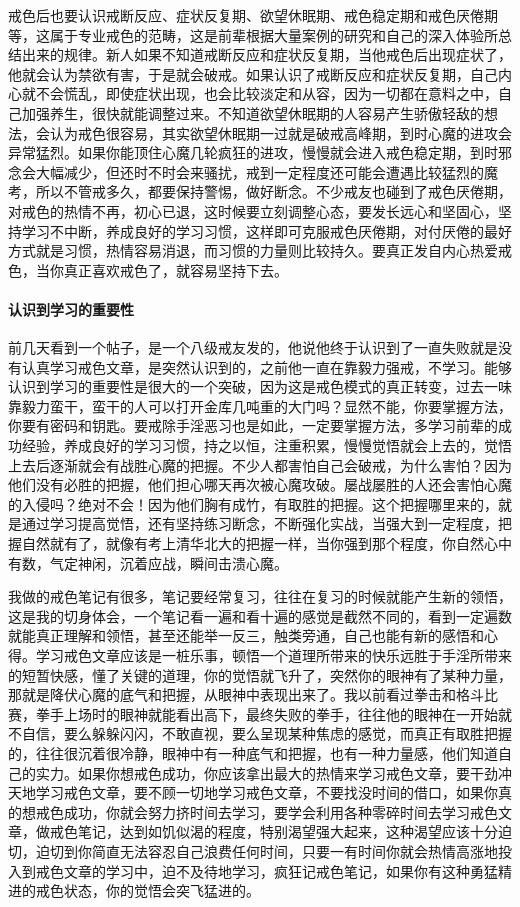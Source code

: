 戒色后也要认识戒断反应、症状反复期、欲望休眠期、戒色稳定期和戒色厌倦期等，这属于专业戒色的范畴，这是前辈根据大量案例的研究和自己的深入体验所总结出来的规律。新人如果不知道戒断反应和症状反复期，当他戒色后出现症状了，他就会认为禁欲有害，于是就会破戒。如果认识了戒断反应和症状反复期，自己内心就不会慌乱，即使症状出现，也会比较淡定和从容，因为一切都在意料之中，自己加强养生，很快就能调整过来。不知道欲望休眠期的人容易产生骄傲轻敌的想法，会认为戒色很容易，其实欲望休眠期一过就是破戒高峰期，到时心魔的进攻会异常猛烈。如果你能顶住心魔几轮疯狂的进攻，慢慢就会进入戒色稳定期，到时邪念会大幅减少，但还时不时会来骚扰，戒到一定程度还可能会遭遇比较猛烈的魔考，所以不管戒多久，都要保持警惕，做好断念。不少戒友也碰到了戒色厌倦期，对戒色的热情不再，初心已退，这时候要立刻调整心态，要发长远心和坚固心，坚持学习不中断，养成良好的学习习惯，这样即可克服戒色厌倦期，对付厌倦的最好方式就是习惯，热情容易消退，而习惯的力量则比较持久。要真正发自内心热爱戒色，当你真正喜欢戒色了，就容易坚持下去。

\paragraph{认识到学习的重要性}

前几天看到一个帖子，是一个八级戒友发的，他说他终于认识到了一直失败就是没有认真学习戒色文章，是突然认识到的，之前他一直在靠毅力强戒，不学习。能够认识到学习的重要性是很大的一个突破，因为这是戒色模式的真正转变，过去一味靠毅力蛮干，蛮干的人可以打开金库几吨重的大门吗？显然不能，你要掌握方法，你要有密码和钥匙。要戒除手淫恶习也是如此，一定要掌握方法，多学习前辈的成功经验，养成良好的学习习惯，持之以恒，注重积累，慢慢觉悟就会上去的，觉悟上去后逐渐就会有战胜心魔的把握。不少人都害怕自己会破戒，为什么害怕？因为他们没有必胜的把握，他们担心哪天再次被心魔攻破。屡战屡胜的人还会害怕心魔的入侵吗？绝对不会！因为他们胸有成竹，有取胜的把握。这个把握哪里来的，就是通过学习提高觉悟，还有坚持练习断念，不断强化实战，当强大到一定程度，把握自然就有了，就像有考上清华北大的把握一样，当你强到那个程度，你自然心中有数，气定神闲，沉着应战，瞬间击溃心魔。

我做的戒色笔记有很多，笔记要经常复习，往往在复习的时候就能产生新的领悟，这是我的切身体会，一个笔记看一遍和看十遍的感觉是截然不同的，看到一定遍数就能真正理解和领悟，甚至还能举一反三，触类旁通，自己也能有新的感悟和心得。学习戒色文章应该是一桩乐事，顿悟一个道理所带来的快乐远胜于手淫所带来的短暂快感，懂了关键的道理，你的觉悟就飞升了，突然你的眼神有了某种力量，那就是降伏心魔的底气和把握，从眼神中表现出来了。我以前看过拳击和格斗比赛，拳手上场时的眼神就能看出高下，最终失败的拳手，往往他的眼神在一开始就不自信，要么躲躲闪闪，不敢直视，要么呈现某种焦虑的感觉，而真正有取胜把握的，往往很沉着很冷静，眼神中有一种底气和把握，也有一种力量感，他们知道自己的实力。如果你想戒色成功，你应该拿出最大的热情来学习戒色文章，要干劲冲天地学习戒色文章，要不顾一切地学习戒色文章，不要找没时间的借口，如果你真的想戒色成功，你就会努力挤时间去学习，要学会利用各种零碎时间去学习戒色文章，做戒色笔记，达到如饥似渴的程度，特别渴望强大起来，这种渴望应该十分迫切，迫切到你简直无法容忍自己浪费任何时间，只要一有时间你就会热情高涨地投入到戒色文章的学习中，迫不及待地学习，疯狂记戒色笔记，如果你有这种勇猛精进的戒色状态，你的觉悟会突飞猛进的。

